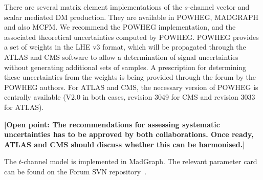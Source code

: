 \documentclass[a4,debug,notitlepage,nobib]{tufte-handout}
\newif\ifATLAS
\newif\ifCMS
\begin{document}
There are several matrix element implementations of the $s$-channel
vector and scalar mediated DM production.
They are available in POWHEG, MADGRAPH
and also MCFM. We recommend the POWHEG implementation, 
and the associated theoretical uncertainties 
computed by POWHEG. 
POWHEG provides a set
of weights in the LHE v3 format, which will be propagated through the
ATLAS and CMS software to allow a determination of signal uncertainties
without generating additional sets of samples. A prescription for
determining these uncertainties from the weights is being provided
through the forum by the POWHEG authors.
For ATLAS and CMS, the necessary version of POWHEG is centrally available 
(V2.0 in both cases, revision 3049 for CMS and revision 3033 for ATLAS).

\textbf{[Open point: The recommendations for assessing systematic uncertainties has to be approved by 
both collaborations. Once ready, ATLAS and CMS should discuss whether this can be harmonised.]}

\ifATLAS 
The $s-$channel vector mediator model is included in this pilot 
MC15 request~\cite{ATLAS_PowhegPythiaMC15Test}, and instructions will be provided on a dedicated
twiki page. 
\fi

\ifCMS
\textbf{[Open point: Add here implementation details for CMS..]}
\fi


The $t$-channel model is implemented in MadGraph. 
The relevant parameter card can be found on the Forum
SVN repository~\cite{ForumSVN_TChannel}. 


\ifATLAS
\textbf{[Open point: Add here implementation details for ATLAS.]}
\fi

\ifCMS
\textbf{[Open point: Add here implementation details for CMS..]}
\fi
\end{document}
